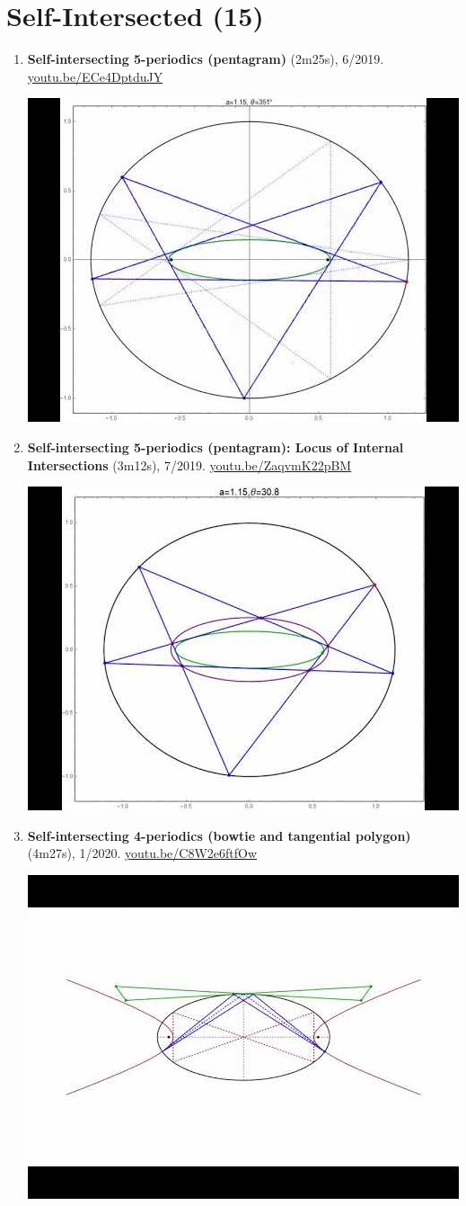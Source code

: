 \documentclass[12pt]{article}
\begin{document}
\section{Self-Intersected (15)}

\begin{enumerate}[resume]
\item \textbf{Self-intersecting 5-periodics (pentagram)} (2m25s), 6/2019. \href{https://youtu.be/ECe4DptduJY}{\url{youtu.be/ECe4DptduJY}}
\begin{center}\includegraphics[width=.5\textwidth]{pics/ECe4DptduJY.jpg}\end{center}
% 
\item \textbf{Self-intersecting 5-periodics (pentagram): Locus of Internal Intersections} (3m12s), 7/2019. \href{https://youtu.be/ZaqvmK22pBM}{\url{youtu.be/ZaqvmK22pBM}}
\begin{center}\includegraphics[width=.5\textwidth]{pics/ZaqvmK22pBM.jpg}\end{center}
% 
\item \textbf{Self-intersecting 4-periodics (bowtie and tangential polygon)} (4m27s), 1/2020. \href{https://youtu.be/C8W2e6ftfOw}{\url{youtu.be/C8W2e6ftfOw}}
\begin{center}\includegraphics[width=.5\textwidth]{pics/C8W2e6ftfOw.jpg}\end{center}

\end{enumerate}
\end{document}
